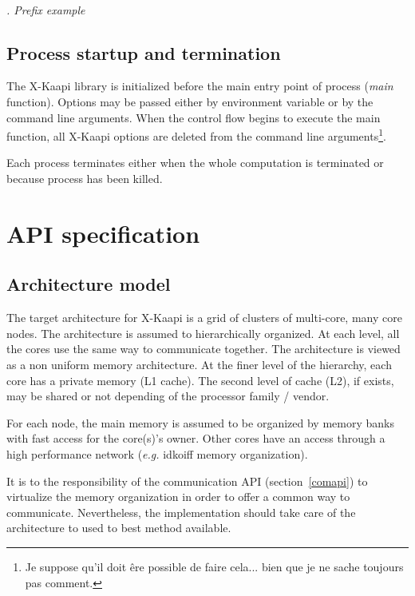 \documentclass[12pt]{report}
\newcommand{\kaapi}{\textsc{X}-Kaapi\xspace}
\renewcommand{\subsubsection}[1]{~\\ \addtocounter{subsubsection}{1} \noindent\textit{
\thesubsubsection. #1\\}}
\begin{document}
\subsubsection{Prefix example}


\section{Process startup and termination}

The \kaapi library is initialized before the main entry point of process (\textit{main} function). Options may be passed either by environment variable or by the command line arguments. When the control flow begins to execute the main function, all \kaapi options are deleted from the command line arguments\footnote{Je suppose qu'il doit êre possible de faire cela... bien que je ne sache toujours pas comment.}.

Each process terminates either when the whole computation is terminated or because process has been killed.


\newpage
\chapter{API specification}

\section{Architecture model}

The target architecture for X-Kaapi is a grid of clusters of multi-core, many core nodes.
The architecture is assumed to hierarchically organized. At each level, all the cores use the same way to communicate together. The architecture is viewed as a non uniform memory architecture.
At the finer level of the hierarchy, each core has a private memory (L1 cache). The second level of cache  (L2), if exists, may be shared or not depending of the processor family / vendor. 

For each node, the main memory is assumed to be organized by memory banks with fast access for the core(s)'s owner. Other cores have an access through a high performance network (\textit{e.g.} idkoiff memory organization).

It is to the responsibility of the communication API (section~\ref{comapi}) to virtualize the memory organization in order to offer a common way to communicate. Nevertheless, the implementation should take care of the architecture to used to best method available.
\end{document}
